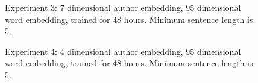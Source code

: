 \documentclass{article}%
\begin{document}
\begin{figure}
\noindent{}
\caption{Experiment 3: 7 dimensional author embedding, 95 dimensional word embedding, trained for 48 hours. Minimum sentence length is 5.}
\end{figure}
\begin{figure}
\noindent{}
\caption{Experiment 4: 4 dimensional author embedding, 95 dimensional word embedding, trained for 48 hours. Minimum sentence length is 5.}
\end{figure}
\end{document}
